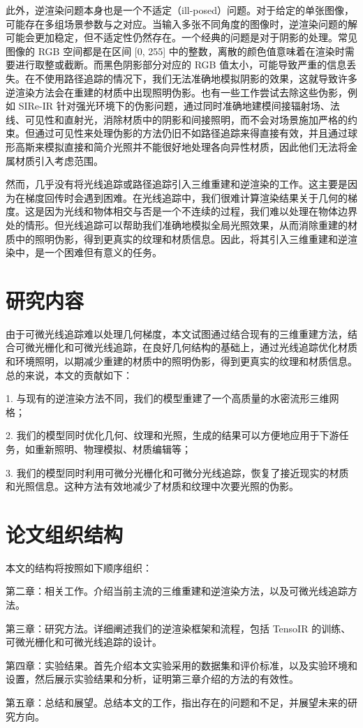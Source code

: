 此外，逆渲染问题本身也是一个不适定（ill-posed）问题。对于给定的单张图像，可能存在多组场景参数与之对应。当输入多张不同角度的图像时，逆渲染问题的解可能会更加稳定，但不适定性仍然存在。一个经典的问题是对于阴影的处理。常见图像的 RGB 空间都是在区间 [0, 255] 中的整数，离散的颜色值意味着在渲染时需要进行取整或截断。而黑色阴影部分对应的 RGB 值太小，可能导致严重的信息丢失。在不使用路径追踪的情况下，我们无法准确地模拟阴影的效果，这就导致许多逆渲染方法会在重建的材质中出现照明伪影。也有一些工作尝试去除这些伪影，例如 SIRe-IR \cite{SIRe-IR} 针对强光环境下的伪影问题，通过同时准确地建模间接辐射场、法线、可见性和直射光，消除材质中的阴影和间接照明，而不会对场景施加严格的约束。但通过可见性来处理伪影的方法仍旧不如路径追踪来得直接有效，并且通过球形高斯来模拟直接和简介光照并不能很好地处理各向异性材质，因此他们无法将金属材质引入考虑范围。

然而，几乎没有将光线追踪或路径追踪引入三维重建和逆渲染的工作。这主要是因为在梯度回传时会遇到困难。在光线追踪中，我们很难计算渲染结果关于几何的梯度。这是因为光线和物体相交与否是一个不连续的过程，我们难以处理在物体边界处的情形。但光线追踪可以帮助我们准确地模拟全局光照效果，从而消除重建的材质中的照明伪影，得到更真实的纹理和材质信息。因此，将其引入三维重建和逆渲染中，是一个困难但有意义的任务。

\section{研究内容}

由于可微光线追踪难以处理几何梯度，本文试图通过结合现有的三维重建方法，结合可微光栅化和可微光线追踪，在良好几何结构的基础上，通过光线追踪优化材质和环境照明，以期减少重建的材质中的照明伪影，得到更真实的纹理和材质信息。总的来说，本文的贡献如下：

1. 与现有的逆渲染方法不同，我们的模型重建了一个高质量的水密流形三维网格；

2. 我们的模型同时优化几何、纹理和光照，生成的结果可以方便地应用于下游任务，如重新照明、物理模拟、材质编辑等；

3. 我们的模型同时利用可微分光栅化和可微分光线追踪，恢复了接近现实的材质和光照信息。这种方法有效地减少了材质和纹理中次要光照的伪影。

\section{论文组织结构}

本文的结构将按照如下顺序组织：

第二章：相关工作。介绍当前主流的三维重建和逆渲染方法，以及可微光线追踪方法。

第三章：研究方法。详细阐述我们的逆渲染框架和流程，包括 TensoIR 的训练、可微光栅化和可微光线追踪的设计。

第四章：实验结果。首先介绍本文实验采用的数据集和评价标准，以及实验环境和设置，然后展示实验结果和分析，证明第三章介绍的方法的有效性。

第五章：总结和展望。总结本文的工作，指出存在的问题和不足，并展望未来的研究方向。
